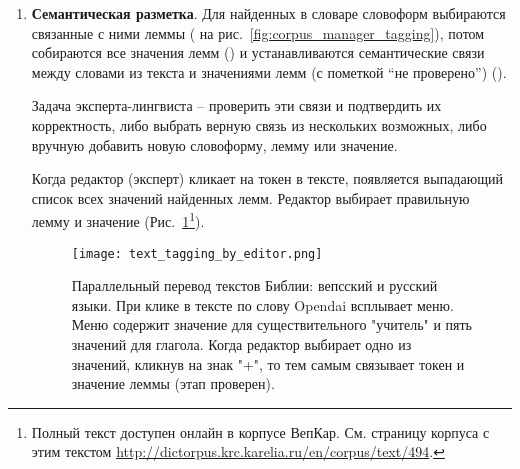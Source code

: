 \begin{enumerate}
\item \textbf{Семантическая разметка}. 
Для найденных в словаре словоформ выбираются связанные с ними леммы ( на рис.~\ref{fig:corpus_manager_tagging}), потом собираются все значения лемм () и устанавливаются семантические связи между словами из текста и значениями лемм (с пометкой “не проверено”) (). 




Задача эксперта-лингвиста -- проверить эти связи и подтвердить их корректность, либо выбрать верную связь из нескольких возможных, либо вручную добавить новую словоформу, лемму или значение. 

Когда редактор (эксперт) кликает на токен в тексте, появляется выпадающий список всех значений найденных лемм. Редактор выбирает правильную лемму и значение (Рис.~\ref{fig:text_tagging_by_editor}\footnote{
Полный текст доступен онлайн в корпусе ВепКар. См. страницу корпуса с этим текстом \url{http://dictorpus.krc.karelia.ru/en/corpus/text/494}.}). 

% 
\begin{figure}
    \centering
    \texttt{[image: text\_tagging\_by\_editor.png]}
\caption{Параллельный перевод текстов Библии: вепсский и русский языки. 
При клике в тексте по слову Opendai всплывает меню. 
Меню содержит значение для существительного "учитель" и пять значений для глагола. 
Когда редактор выбирает одно из значений, кликнув на знак "+", то тем самым связывает токен и значение леммы ({\color{red}этап  проверен}).}
 \label{fig:text_tagging_by_editor}
\end{figure}


\end{enumerate}
